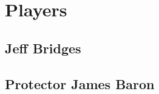 \twocolumn

\chapter{Players}
\label{cha:players}

\section{Jeff Bridges}

\section{Protector James Baron}

